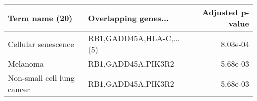 \begin{tabular}{llr}
\toprule
            Term name (20) &     Overlapping genes... &  Adjusted p-value \\
\midrule
       Cellular senescence & RB1,GADD45A,HLA-C,...(5) &          8.03e-04 \\
                  Melanoma &       RB1,GADD45A,PIK3R2 &          5.68e-03 \\
Non-small cell lung cancer &       RB1,GADD45A,PIK3R2 &          5.68e-03 \\
\bottomrule
\end{tabular}
